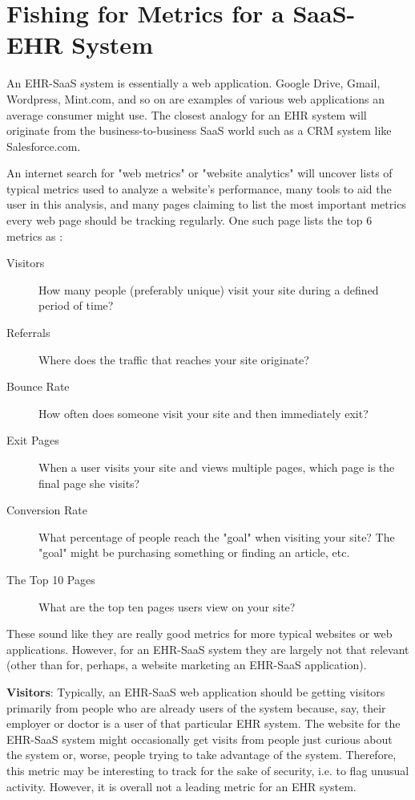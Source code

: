 \documentclass[10pt]{article}
\begin{document}
\section{Fishing for Metrics for a SaaS-EHR System}
\label{sec:EHR-SaaS-Metrics}


An EHR-SaaS system is essentially a web application.
Google Drive, Gmail, Wordpress, Mint.com, and so on are examples of various web applications an average consumer might use.
The closest analogy for an EHR system will originate from the business-to-business SaaS world such as a CRM system like Salesforce.com.

An internet search for "web metrics" or "website analytics" will uncover lists of typical metrics used to analyze a website's performance, many tools to aid the user in this analysis, and many pages claiming to list the most important metrics every web page should be tracking regularly.
One such page lists the top 6 metrics as \cite{top-6-metrics}:
\begin{description}
	\item[Visitors] How many people (preferably unique) visit your site during a defined period of time?
	\item[Referrals] Where does the traffic that reaches your site originate?
	\item[Bounce Rate] How often does someone visit your site and then immediately exit?
	\item[Exit Pages] When a user visits your site and views multiple pages, which page is the final page she visits?
	\item[Conversion Rate] What percentage of people reach the "goal" when visiting your site? The "goal" might be purchasing something or finding an article, etc.
	\item[The Top 10 Pages] What are the top ten pages users view on your site?
\end{description}

These sound like they are really good metrics for more typical websites or web applications.
However, for an EHR-SaaS system they are largely not that relevant (other than for, perhaps, a website marketing an EHR-SaaS application).

\textbf{Visitors}: Typically, an EHR-SaaS web application should be getting visitors primarily from people who are already users of the system because, say, their employer or doctor is a user of that particular EHR system.
The website for the EHR-SaaS system might occasionally get visits from people just curious about the system or, worse, people trying to take advantage of the system.
Therefore, this metric may be interesting to track for the sake of security, i.e. to flag unusual activity.
However, it is overall not a leading metric for an EHR system.
\end{document}
